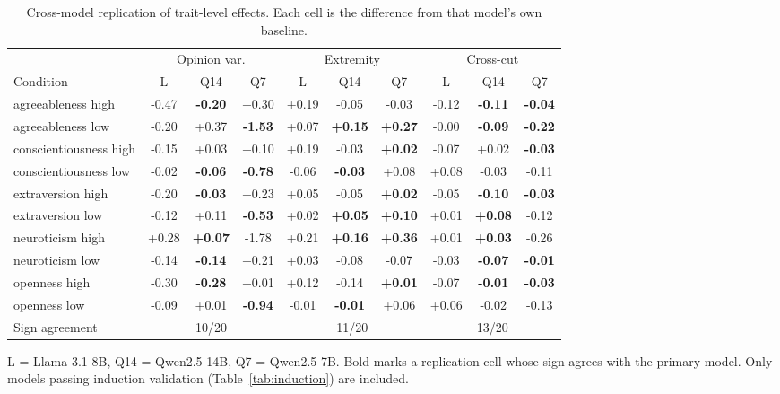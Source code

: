 \begin{table}[t]\centering
\scriptsize
\setlength{\tabcolsep}{3pt}
\caption{Cross-model replication of trait-level effects. Each cell is the difference from that model's own baseline.}
\label{tab:crossmodel}
\begin{tabular}{@{}lccccccccc@{}}
\toprule
 & \multicolumn{3}{c}{Opinion var.} & \multicolumn{3}{c}{Extremity} & \multicolumn{3}{c}{Cross-cut} \\
Condition & L & Q14 & Q7 & L & Q14 & Q7 & L & Q14 & Q7 \\
\midrule
agreeableness high & -0.47 & \textbf{-0.20} & +0.30 & +0.19 & -0.05 & -0.03 & -0.12 & \textbf{-0.11} & \textbf{-0.04} \\
agreeableness low & -0.20 & +0.37 & \textbf{-1.53} & +0.07 & \textbf{+0.15} & \textbf{+0.27} & -0.00 & \textbf{-0.09} & \textbf{-0.22} \\
conscientiousness high & -0.15 & +0.03 & +0.10 & +0.19 & -0.03 & \textbf{+0.02} & -0.07 & +0.02 & \textbf{-0.03} \\
conscientiousness low & -0.02 & \textbf{-0.06} & \textbf{-0.78} & -0.06 & \textbf{-0.03} & +0.08 & +0.08 & -0.03 & -0.11 \\
extraversion high & -0.20 & \textbf{-0.03} & +0.23 & +0.05 & -0.05 & \textbf{+0.02} & -0.05 & \textbf{-0.10} & \textbf{-0.03} \\
extraversion low & -0.12 & +0.11 & \textbf{-0.53} & +0.02 & \textbf{+0.05} & \textbf{+0.10} & +0.01 & \textbf{+0.08} & -0.12 \\
neuroticism high & +0.28 & \textbf{+0.07} & -1.78 & +0.21 & \textbf{+0.16} & \textbf{+0.36} & +0.01 & \textbf{+0.03} & -0.26 \\
neuroticism low & -0.14 & \textbf{-0.14} & +0.21 & +0.03 & -0.08 & -0.07 & -0.03 & \textbf{-0.07} & \textbf{-0.01} \\
openness high & -0.30 & \textbf{-0.28} & +0.01 & +0.12 & -0.14 & \textbf{+0.01} & -0.07 & \textbf{-0.01} & \textbf{-0.03} \\
openness low & -0.09 & +0.01 & \textbf{-0.94} & -0.01 & \textbf{-0.01} & +0.06 & +0.06 & -0.02 & -0.13 \\
\midrule
Sign agreement & \multicolumn{3}{c}{10/20} & \multicolumn{3}{c}{11/20} & \multicolumn{3}{c}{13/20} \\
\bottomrule
\end{tabular}
\par\smallskip\footnotesize L = Llama-3.1-8B, Q14 = Qwen2.5-14B, Q7 = Qwen2.5-7B. Bold marks a replication cell whose sign agrees with the primary model. Only models passing induction validation (Table~\ref{tab:induction}) are included.
\end{table}
